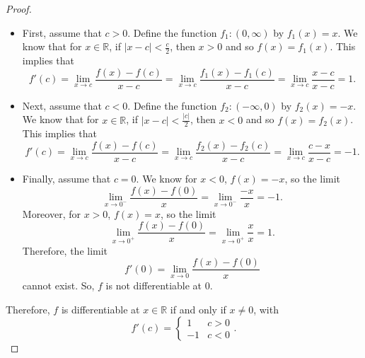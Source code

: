 \documentclass[a4paper, openany]{memoir}
\theoremstyle{definition}
\theoremstyle{plain}
\begin{document}
\begin{proof}
\hspace*{0pt}
\begin{itemize}
    \item First, assume that $c > 0$. Define the function $f_1: (0, \infty)$ by $f_1(x) = x$. We know that for $x \in \mathbb{R}$, if $|x - c| < \frac{c}{2}$, then $x > 0$ and so $f(x) = f_1(x)$. This implies that
    \[f'(c) = \lim_{x \to c} \frac{f(x) - f(c)}{x - c} = \lim_{x \to c} \frac{f_1(x) - f_1(c)}{x - c} = \lim_{x \to c} \frac{x - c}{x - c} = 1.\]
    
    \item Next, assume that $c < 0$. Define the function $f_2: (-\infty, 0)$ by $f_2(x) = -x$. We know that for $x \in \mathbb{R}$, if $|x - c| < \frac{|c|}{2}$, then $x < 0$ and so $f(x) = f_2(x)$. This implies that
    \[f'(c) = \lim_{x \to c} \frac{f(x) - f(c)}{x - c} = \lim_{x \to c} \frac{f_2(x) - f_2(c)}{x - c} = \lim_{x \to c} \frac{c - x}{x - c} = -1.\]
    
    \item Finally, assume that $c = 0$. We know for $x < 0$, $f(x) = -x$, so the limit
    \[\lim_{x \to 0^-} \frac{f(x) - f(0)}{x} = \lim_{x \to 0^-} \frac{-x}{x} = -1.\]
    Moreover, for $x > 0$, $f(x) = x$, so the limit
    \[\lim_{x \to 0^+} \frac{f(x) - f(0)}{x} = \lim_{x \to 0^+} \frac{x}{x} = 1.\]
    Therefore, the limit
    \[f'(0) = \lim_{x \to 0} \frac{f(x) - f(0)}{x}\]
    cannot exist. So, $f$ is not differentiable at $0$.
\end{itemize}
Therefore, $f$ is differentiable at $x \in \mathbb{R}$ if and only if $x \neq 0$, with
\[f'(c) = \begin{cases}
1 & c > 0 \\
-1 & c < 0
\end{cases}.\]
\end{proof}
\end{document}

